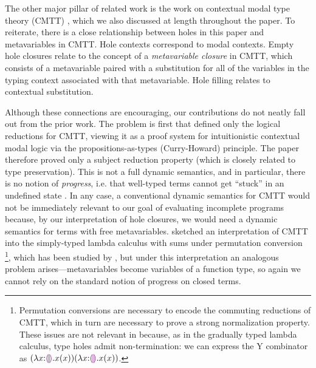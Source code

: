 The other major pillar of related work is the work on contextual modal type theory (CMTT) \cite{Nanevski2008}, which we also discussed at length throughout the paper. To reiterate, there is a close relationship between holes in this paper and metavariables in CMTT. Hole contexts correspond to modal contexts.
Empty hole closures 
relate to the concept of a \emph{metavariable closure} in CMTT, which consists
of a metavariable paired with a substitution for all of the variables in the
typing context associated with that metavariable. Hole filling relates to contextual substitution. 

Although these connections are encouraging, our contributions do not neatly fall out from the prior work. The problem is first that \citet{Nanevski2008} defined only the logical reductions for CMTT, viewing it as a proof system for intuitionistic contextual modal logic via the propositions-as-types (Curry-Howard) principle. 
The paper therefore proved only a subject reduction property (which is closely related to type preservation). 
This is not a full dynamic semantics, and in particular, there is no notion of \emph{progress}, i.e. that well-typed terms cannot get ``stuck'' in an undefined state \cite{wright94:_type_soundness}. 
In any case, a conventional dynamic semantics for CMTT would not be immediately relevant to our goal of evaluating incomplete programs because, by our interpretation of hole closures, we would need a dynamic semantics for terms with free metavariables. 
\citet{Nanevski2008} sketched an interpretation of CMTT into the simply-typed lambda calculus with sums under permutation conversion%
\footnote{Permutation conversions are necessary to encode the commuting reductions of CMTT, which in turn are necessary to prove a strong normalization property. These issues are not relevant in \HazelnutLive because, as in the gradually typed lambda calculus, type holes admit non-termination: we can express the Y combinator as $(\lambda x{:}\textcolor{violet}{\llparenthesis}\textcolor{violet}{\rrparenthesis}.x(x)) (\lambda x{:}\textcolor{violet}{\llparenthesis}\textcolor{violet}{\rrparenthesis}.x(x))$.}, 
which has been studied by \citet{DBLP:journals/iandc/Groote02}, 
but under this interpretation an analogous problem arises---metavariables become variables of a function type, so again we cannot rely on the standard notion of progress on closed terms.

